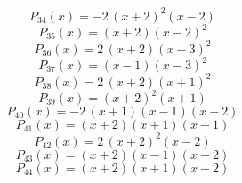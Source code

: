 \subitem \begin{dmath*}P_{34}(x) = -2 \, {\left(x + 2\right)}^{2} {\left(x - 2\right)} \end{dmath*}\vspace{-1.2cm}
\subitem \begin{dmath*}P_{35}(x) = {\left(x + 2\right)} {\left(x - 2\right)}^{2} \end{dmath*}\vspace{-1.2cm}
\subitem \begin{dmath*}P_{36}(x) = 2 \, {\left(x + 2\right)} {\left(x - 3\right)}^{2} \end{dmath*}\vspace{-1.2cm}
\subitem \begin{dmath*}P_{37}(x) = {\left(x - 1\right)} {\left(x - 3\right)}^{2} \end{dmath*}\vspace{-1.2cm}
\subitem \begin{dmath*}P_{38}(x) = 2 \, {\left(x + 2\right)} {\left(x + 1\right)}^{2} \end{dmath*}\vspace{-1.2cm}
\subitem \begin{dmath*}P_{39}(x) = {\left(x + 2\right)}^{2} {\left(x + 1\right)} \end{dmath*}\vspace{-1.2cm}
\subitem \begin{dmath*}P_{40}(x) = -2 \, {\left(x + 1\right)} {\left(x - 1\right)} {\left(x - 2\right)} \end{dmath*}\vspace{-1.2cm}
\subitem \begin{dmath*}P_{41}(x) = {\left(x + 2\right)} {\left(x + 1\right)} {\left(x - 1\right)} \end{dmath*}\vspace{-1.2cm}
\subitem \begin{dmath*}P_{42}(x) = 2 \, {\left(x + 2\right)}^{2} {\left(x - 2\right)} \end{dmath*}\vspace{-1.2cm}
\subitem \begin{dmath*}P_{43}(x) = {\left(x + 2\right)} {\left(x - 1\right)} {\left(x - 2\right)} \end{dmath*}\vspace{-1.2cm}
\subitem \begin{dmath*}P_{44}(x) = {\left(x + 2\right)} {\left(x + 1\right)} {\left(x - 2\right)} \end{dmath*}\vspace{-1.2cm}
